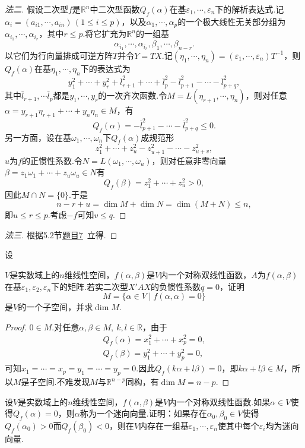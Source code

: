 \begin{proof}[法二]
	假设二次型$f$是$\mathbb{R}^n$中二次型函数$Q_f(\alpha)$在基$\varepsilon_1,\cdots,\varepsilon_n$下的解析表达式.记$\alpha_i=(a_{i1},\cdots,a_{in})\,(1\le i\le p)$，以及$\alpha_1,\cdots,\alpha_p$的一个极大线性无关部分组为$\alpha_{i_1},\cdots,\alpha_{i_r}$，其中$r\le p$.将它扩充为$\mathbb{R}^n$的一组基
	\[
		\alpha_{i_1},\cdots,\alpha_{i_r},\beta_1,\cdots,\beta_{n-r}.
	\]
	以它们为行向量排成可逆方阵$T$并令$Y=TX$.记$(\eta_1,\cdots,\eta_n)=(\varepsilon_1,\cdots,\varepsilon_n)T^{-1}$，则$Q_f(\alpha)$在基$\eta_1,\cdots,\eta_n$下的表达式为
	\[
		y_1^2+\cdots+y_r^2+\bar{l}_{r+1}^2+\cdots+\bar{l}_p^2-\bar{l}_{p+1}^2-\cdots-\bar{l}_{p+q}^2,
	\]
	其中$\bar{l}_{r+1},\cdots\bar{l}_p$都是$y_1,\cdots,y_r$的一次齐次函数.令$M=L(\eta_{r+1},\cdots,\eta_n)$，则对任意$\alpha=y_{r+1}\eta_{r+1}+\cdots+y_n\eta_n\in M$，有
	\[
		Q_f(\alpha)=-\bar{l}_{p+1}^2-\cdots-\bar{l}_{p+q}^2\le 0.
	\]
	另一方面，设在基$\omega_1,\cdots,\omega_n$下$Q_f(\alpha)$成规范形
	\[
		z_1^2+\cdots+z_u^2-z_{u+1}^2-\cdots-z_{u+v}^2,
	\]
	$u$为$f$的正惯性系数.令$N=L(\omega_1,\cdots,\omega_u)$，则对任意非零向量$\beta=z_1\omega_1+\cdots+z_u\omega_u\in N$有
	\[
		Q_f(\beta)=z_1^2+\cdots+z_u^2>0,
	\]
	因此$M\cap N=\{0\}$.于是
	\[
		n-r+u=\dim M+\dim N=\dim(M+N)\le n,
	\]
	即$u\le r\le p$.考虑$-f$可知$v\le q$.
\end{proof}
\begin{proof}[法三]
	根据5.2节\hyperlink{RankOfOneDegreeHomogeneousQuadraticForm}{题目7}~立得.
\end{proof}
\begin{prob}[6]
	\hypertarget{KernelOfBilinearFunction}{设}$V$是实数域上的$n$维线性空间，$f(\alpha,\beta)$是$V$内一个对称双线性函数，$A$为$f(\alpha,\beta)$在基$\varepsilon_1,\varepsilon_2,\varepsilon_n$下的矩阵.若实二次型$X'AX$的负惯性系数$q=0$，证明
	\[
		M=\{\alpha\in V\mid f(\alpha,\alpha)=0\}
	\]
	是$V$的一个子空间，并求$\dim M$.
\end{prob}
\begin{proof}
	$0\in M$.对任意$\alpha,\beta\in M,\ k,l\in\mathbb{R}$，由于
	\begin{gather*}
		Q_f(\alpha)=x_1^2+\cdots+x_p^2=0,\\
		Q_f(\beta)=y_1^2+\cdots+y_p^2=0,
	\end{gather*}
	可知$x_1=\cdots=x_p=y_1=\cdots=y_p=0$.因此$Q_f(k\alpha+l\beta)=0$，即$k\alpha+l\beta\in M$，所以$M$是子空间.不难发现$M$与$\mathbb{R}^{n-p}$同构，有$\dim M=n-p$.
\end{proof}
\begin{prob}[7]
	设$V$是实数域上的$n$维线性空间，$f(\alpha,\beta)$是$V$内一个对称双线性函数.如果$\alpha\in V$使得$Q_f(\alpha)=0$，则$\alpha$称为一个{\heiti 迷向向量}.证明：如果存在$\alpha_0,\beta_0\in V$使得$Q_f(\alpha_0)>0$而$Q_f(\beta_0)<0$，则在$V$内存在一组基$\varepsilon_1,\cdots,\varepsilon_n$使其中每个$\varepsilon_i$均为迷向向量.
\end{prob}
